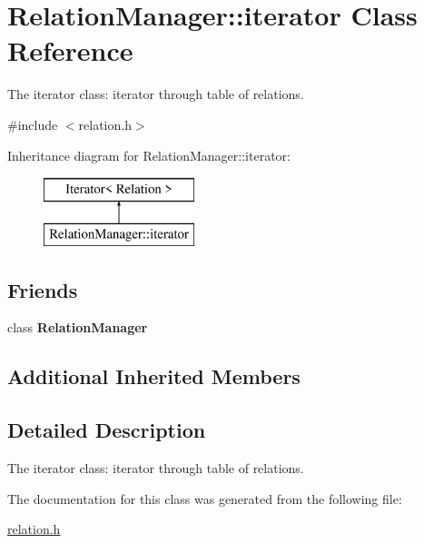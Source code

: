 \hypertarget{class_relation_manager_1_1iterator}{}\section{Relation\+Manager\+:\+:iterator Class Reference}
\label{class_relation_manager_1_1iterator}


The iterator class\+: iterator through table of relations.  




{\ttfamily \#include $<$relation.\+h$>$}

Inheritance diagram for Relation\+Manager\+:\+:iterator\+:\begin{figure}[H]
\begin{center}
\leavevmode
\includegraphics[height=2.000000cm]{class_relation_manager_1_1iterator}
\end{center}
\end{figure}
\subsection*{Friends}
\begin{DoxyCompactItemize}
\item 
\mbox{\label{class_relation_manager_1_1iterator_a55fae9c2e48742dd0a8596e6d8721775}} 
class {\bfseries Relation\+Manager}
\end{DoxyCompactItemize}
\subsection*{Additional Inherited Members}


\subsection{Detailed Description}
The iterator class\+: iterator through table of relations. 

The documentation for this class was generated from the following file\+:\begin{DoxyCompactItemize}
\item 
\hyperlink{relation_8h}{relation.\+h}\end{DoxyCompactItemize}
